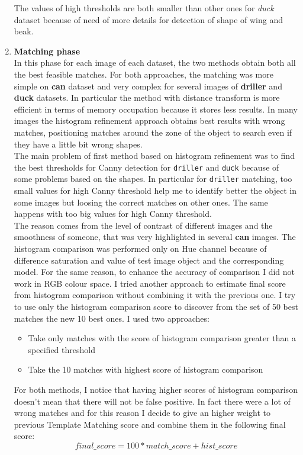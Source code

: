 \documentclass{article}
\begin{document}
\begin{enumerate}
{The values of high thresholds are both smaller than other ones for \textit{duck} dataset because of need of more details for detection of shape of wing and beak.
}
\item{\textbf{Matching phase}\\
In this phase for each image of each dataset, the two methods obtain both all the best feasible matches. For both approaches, the matching was more simple on \textbf{can} dataset and very complex for several images of \textbf{driller} and \textbf{duck} datasets. In particular the method with distance transform is more efficient in terms of memory occupation because it stores less results.
In many images the histogram refinement approach obtains best results with wrong matches, positioning matches around the zone of the object to search even if they have a little bit wrong shapes.\\
The main problem of first method based on histogram refinement was to find the best thresholds for Canny detection for \texttt{driller} and \texttt{duck} because of some problems based on the shapes. In particular for \texttt{driller} matching, too small values for high Canny threshold help me to identify better the object in some images but loosing the correct matches on other ones. The same happens with too big values for high Canny threshold.\\
The reason comes from the level of contrast of different images and the smoothness of someone, that was very highlighted in several \textbf{can} images. The histogram comparison was performed only on Hue channel because of difference saturation and value of test image object and the corresponding model. For the same reason, to enhance the accuracy of comparison I did not work in RGB colour space. I tried another approach to estimate final score from histogram comparison without combining it with the previous one. I try to use only the histogram comparison score to discover from the set of 50 best matches the new 10 best ones. I used two approaches: 
\begin{itemize}
\item{Take only matches with the score of histogram comparison greater than a specified threshold}
\item{Take the 10 matches with highest score of histogram comparison}
\end{itemize}
For both methods, I notice that having higher scores of histogram comparison doesn't mean that there will not be false positive. In fact there were a lot of wrong matches and for this reason I decide to give an higher weight to previous Template Matching score and combine them in the following final score:
$$final\_score=100*match\_score + hist\_score$$}
\end{enumerate}
\end{document}
